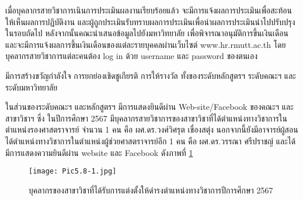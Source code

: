 เมื่อบุคลากรสายวิชาการเนินการประเมินผลงานเรียบร้อยแล้ว  จะมีการแจ้งผลการประเมินเพื่อสะท้อนให้เห็นผลการปฏิบัติงาน และผู้ถูกประเมินรับทราบผลการประเมินเพื่อนำผลการประเมินนำไปปรับปรุงในรอบถัดไป หลังจากนั้นคณะนำเสนอข้อมูลไปยังมหาวิทยาลัย เพื่อพิจารณาอนุมัติการขึ้นเงินเดือน และจะมีการแจ้งผลการขึ้นเงินเดือนของแต่ละรายบุคคลผ่านเว็บไซต์ www.hr.rmutt.ac.th โดยบุคลากรสายวิชาการแต่ละคนต้อง log in ด้วย username และ password ของตนเอง

มีการสร้างขวัญกำลังใจ การยกย่องเชิดชูเกียรติ การให้รางวัล ทั้งของระดับหลักสูตรฯ ระดับคณะฯ และระดับมหาวิทยาลัย 

ในส่วนของระดับคณะฯ และหลักสูตรฯ มีการแสดงยินดีผ่าน Web-site/Facebook ของคณะฯ และสาขาวิชาฯ ซึ่ง
ในปีการศึกษา 2567 มีบุคลากรสายวิชาการของสาขาวิชาที่ได้ตำแหน่งทางวิชาการในตำแหน่งรองศาสตราจารย์ จำนวน 1 คน 
 คือ ผศ.ดร.วงศ์วิศรุต เขื่องสตุ่ง นอกจากนี้ยังมีอาจารย์ผู้สอนได้ตำแหน่งทางวิชาการในตำแหน่งผู้ช่วยศาสตราจารย์อีก 1 คน คือ ผศ.ดร.วรรณา ศรีปราชญ์ และได้มีการแสดงความยินดีผ่าน website และ Facebook ดังภาพที่ \ref{Pic5.8-1}
\begin{figure}[h!]
	\texttt{[image: Pic5.8-1.jpg]}
	\caption{บุคลากรของสาขาวิชาที่ได้รับการแต่งตั้งให้ดำรงตำแหน่งทางวิชาการปีการศึกษา 2567}
	\label{Pic5.8-1}
\end{figure}


